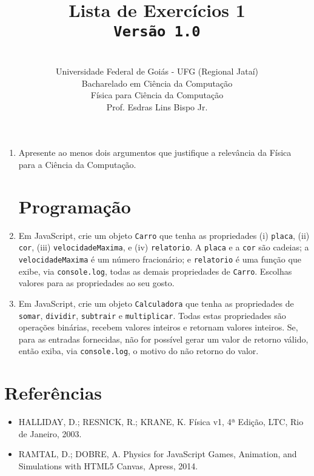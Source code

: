 \documentclass[12pt,a4paper,oneside]{article}
\author{\\Universidade Federal de Goiás - UFG (Regional Jataí) \\Bacharelado em Ciência da Computação \\Física para Ciência da Computação \\Prof. Esdras Lins Bispo Jr.}
\title{
	{\sc \huge Lista de Exercícios 1} 
	\\{\tt Versão 1.0}
}
\begin{document}
\maketitle

\begin{enumerate}

\section{Conceitos}

	\item Apresente ao menos dois argumentos que justifique a relevância da Física para a Ciência da Computação.
	
\section{Programação}
	
	\item Em JavaScript, crie um objeto	{\tt Carro} que tenha as propriedades (i) {\tt placa}, (ii) {\tt cor}, (iii) {\tt velocidadeMaxima}, e (iv) {\tt relatorio}. A {\tt placa} e a {\tt cor} são cadeias; a {\tt velocidadeMaxima} é um número fracionário; e {\tt relatorio} é uma função que exibe, via {\tt console.log}, todas as demais propriedades de {\tt Carro}. Escolhas valores para as propriedades ao seu gosto. 
	
	\item Em JavaScript, crie um objeto {\tt Calculadora} que tenha as propriedades de {\tt somar}, {\tt dividir}, {\tt subtrair} e {\tt multiplicar}. Todas estas propriedades são operações binárias, recebem valores inteiros e retornam valores inteiros. Se, para as entradas fornecidas, não for possível gerar um valor de retorno válido, então exiba, via {\tt console.log}, o motivo do não retorno do valor.
		
\end{enumerate}

\section{Referências}

\begin{itemize}
	\item HALLIDAY, D.; RESNICK, R.; KRANE, K. Física v1, 4ª Edição, LTC, Rio de Janeiro, 2003.

	\item RAMTAL, D.; DOBRE, A. Physics for JavaScript Games, Animation, and Simulations with HTML5 Canvas, Apress, 2014.
\end{itemize}
\end{document}
